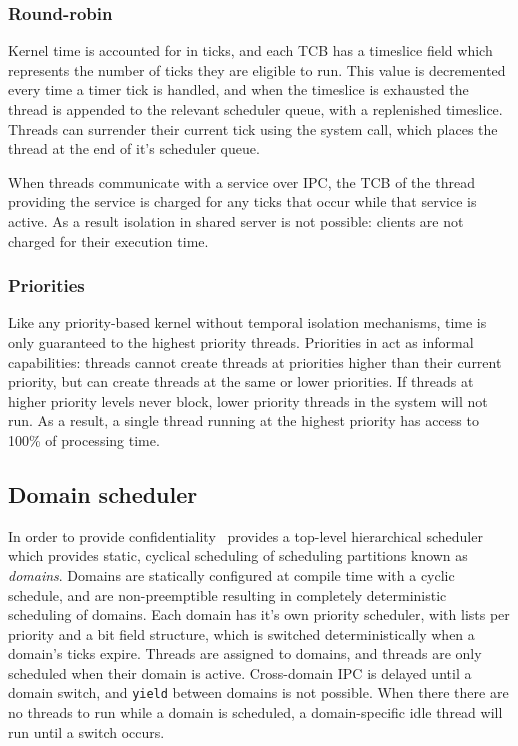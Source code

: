 \subsubsection{Round-robin}

Kernel time is accounted for in ticks, and each TCB has a timeslice field which represents the number of ticks they are eligible to run. 
This value is decremented every time a timer tick is handled, and when the timeslice is exhausted the thread is appended to the relevant scheduler queue, with a replenished timeslice.
Threads can surrender their current tick using the  system call, which places the thread
at the end of it's scheduler queue.

When threads communicate with a service over \gls{IPC}, the TCB of the thread providing the service
is charged for any ticks that occur while that service is active. As a result isolation in shared
server is not possible: clients are not charged for their execution time. 

\subsubsection{Priorities}

Like any priority-based kernel without temporal isolation mechanisms, time is only guaranteed to the highest priority threads.
Priorities in \selfour act as informal capabilities: threads cannot create threads at priorities higher than their current priority, but can create threads at the same or lower priorities.
If threads at higher priority levels never block, lower priority threads in the system will not run.
As a result, a single thread running at the highest priority has access to 100\% of processing time.

\subsection{Domain scheduler}

In order to provide confidentiality~\citep{Murray_MBGBSLGK_13} \selfour provides a top-level hierarchical scheduler
which provides static, cyclical scheduling of scheduling partitions known as \emph{domains}. 
Domains are statically configured at compile time with a cyclic schedule, and are non-preemptible
resulting in completely deterministic scheduling of domains.
Each domain has it's own priority scheduler, with lists per priority and a bit field structure, which is switched deterministically when a domain's
ticks expire. 
Threads are assigned to domains, and threads are only scheduled when their domain is active.
Cross-domain \gls{IPC} is delayed until a domain switch, and \texttt{yield} between domains is not
possible. When there there are no threads to run while a domain is scheduled, a domain-specific idle thread will run until a switch occurs.


